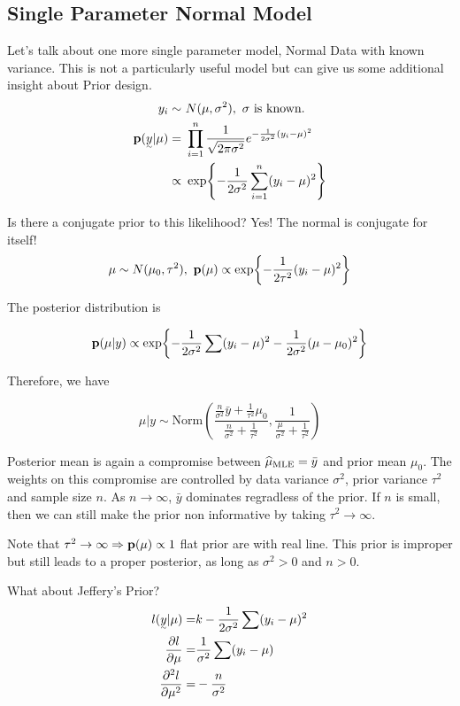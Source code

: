 \subsection{Single Parameter Normal Model}

Let's talk about one more single parameter model, Normal Data with known variance. This is not a particularly useful model but can give us some additional insight about Prior design.
\begin{align*}
    y_i 
    \sim&~ N(\mu, \sigma^2), ~\text{$\sigma$ is known}.\\
    \p(\vec{y}| \mu) 
    =&~ \prod_{i=1}^n \frac{1}{\sqrt{2\pi \sigma^2}} e^{-\frac{1}{2\sigma^2} (y_i - \mu)^2} \\
    \propto&~ \exp{-\frac{1}{2\sigma^2} \sum_{i=1}^{n} (y_i - \mu)^2}
\end{align*}

Is there a conjugate prior to this likelihood? Yes! The normal is conjugate for itself!
\begin{align*}
    \mu \sim N(\mu_0, \tau^2), ~{\mathbf p}(\mu) \propto \exp{-\frac{1}{2\tau^2} (y_i - \mu)^2}
\end{align*}

The posterior distribution is

\[
{\mathbf p}(\mu | y) \propto \exp{-\frac{1}{2\sigma^2} \sum (y_i - \mu)^2 - \frac{1}{2\sigma^2} (\mu - \mu_0)^2}
\]

Therefore, we have

\[
\mu|y \sim \text{Norm}(\frac{\frac{n}{\sigma^2} \bar{y} + \frac{1}{\tau^2} \mu_0}{\frac{n}{\sigma^2} + \frac{1}{\tau^2}}, \frac{1}{\frac{\mu}{\sigma^2} + \frac{1}{\tau^2}})
\]

Posterior mean is again a compromise between $\widehat \mu_{\text{MLE}} = \bar{y}$ and prior mean $\mu_0$. The weights on this compromise are controlled by data variance $\sigma^2$, prior variance $\tau^2$ and sample size $n$. As $n \rightarrow \infty$, $\bar{y}$ dominates regradless of the prior. If $n$ is small, then we can still make the prior non informative by taking $\tau^2 \rightarrow \infty$.

Note that $\tau^2 \rightarrow \infty \Rightarrow {\mathbf p}(\mu) \propto 1$ flat prior are with real line. This prior is improper but still leads to a proper posterior, as long as $\sigma^2 > 0$ and $n > 0$.

What about Jeffery's Prior?
\begin{align*}
    l(\vec{y}| \mu) =& k - \frac{1}{2\sigma^2} \sum(y_i - \mu)^2\\
    \pdv{l}{\mu} =& \frac{1}{\sigma^2} \sum(y_i - \mu)\\
    \pdv[2]{l}{\mu} =& - \frac{n}{\sigma^2}
\end{align*}

